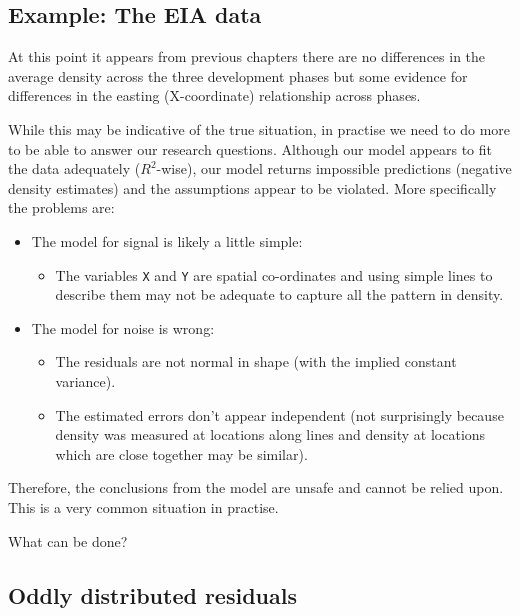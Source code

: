 \documentclass[
  oneside]{krantz}
\providecommand{\tightlist}{%
  \setlength{\itemsep}{0pt}\setlength{\parskip}{0pt}}
\begin{document}
\hypertarget{example-the-eia-data}{%
\subsection{Example: The EIA data}\label{example-the-eia-data}}

At this point it appears from previous chapters there are no differences in the average density across the three development phases but some evidence for differences in the easting (X-coordinate) relationship across phases.

While this may be indicative of the true situation, in practise we need to do more to be able to answer our research questions. Although our model appears to fit the data adequately (\(R^2\)-wise), our model returns impossible predictions (negative density estimates) and the assumptions appear to be violated. More specifically the problems are:

\begin{itemize}
\tightlist
\item
  The model for signal is likely a little simple:

  \begin{itemize}
  \tightlist
  \item
    The variables \texttt{X} and \texttt{Y} are spatial co-ordinates and using simple lines to describe them may not be adequate to capture all the pattern in density.
  \end{itemize}
\item
  The model for noise is wrong:

  \begin{itemize}
  \tightlist
  \item
    The residuals are not normal in shape (with the implied constant variance).
  \item
    The estimated errors don't appear independent (not surprisingly because density was measured at locations along lines and density at locations which are close together may be similar).
  \end{itemize}
\end{itemize}

Therefore, the conclusions from the model are unsafe and cannot be relied upon. This is a very common situation in practise.

What can be done?

\hypertarget{oddly-distributed-residuals}{%
\subsection{Oddly distributed residuals}\label{oddly-distributed-residuals}}
\end{document}
